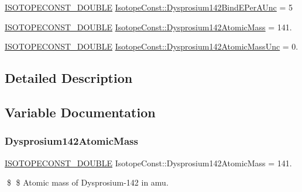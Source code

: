 \begin{DoxyCompactItemize}
\mbox{\hyperlink{group___isotope_const-_macros_ga8f45a7272ce02c0b4c65c44636ed719a}{I\+S\+O\+T\+O\+P\+E\+C\+O\+N\+S\+T\+\_\+\+D\+O\+U\+B\+LE}} \mbox{\hyperlink{group___isotope_const-_dysprosium-_dy142_ga729e250d2463146aabf06a8cfa726ab4}{Isotope\+Const\+::\+Dysprosium142\+Bind\+E\+Per\+A\+Unc}} = 5
\item 
\mbox{\hyperlink{group___isotope_const-_macros_ga8f45a7272ce02c0b4c65c44636ed719a}{I\+S\+O\+T\+O\+P\+E\+C\+O\+N\+S\+T\+\_\+\+D\+O\+U\+B\+LE}} \mbox{\hyperlink{group___isotope_const-_dysprosium-_dy142_ga8f7395bdf273be071bc6ed024f11041d}{Isotope\+Const\+::\+Dysprosium142\+Atomic\+Mass}} = 141.
\item 
\mbox{\hyperlink{group___isotope_const-_macros_ga8f45a7272ce02c0b4c65c44636ed719a}{I\+S\+O\+T\+O\+P\+E\+C\+O\+N\+S\+T\+\_\+\+D\+O\+U\+B\+LE}} \mbox{\hyperlink{group___isotope_const-_dysprosium-_dy142_gaae5a03c060d79bcedf221cc97080e5fd}{Isotope\+Const\+::\+Dysprosium142\+Atomic\+Mass\+Unc}} = 0.
\end{DoxyCompactItemize}


\subsection{Detailed Description}


\subsection{Variable Documentation}
\mbox{\label{group___isotope_const-_dysprosium-_dy142_ga8f7395bdf273be071bc6ed024f11041d}} 
\subsubsection{\texorpdfstring{Dysprosium142\+Atomic\+Mass}{Dysprosium142AtomicMass}}
{\footnotesize\ttfamily \mbox{\hyperlink{group___isotope_const-_macros_ga8f45a7272ce02c0b4c65c44636ed719a}{I\+S\+O\+T\+O\+P\+E\+C\+O\+N\+S\+T\+\_\+\+D\+O\+U\+B\+LE}} Isotope\+Const\+::\+Dysprosium142\+Atomic\+Mass = 141.}

\$ \$ Atomic mass of Dysprosium-\/142 in amu. \mbox{\label{group___isotope_const-_dysprosium-_dy142_gaae5a03c060d79bcedf221cc97080e5fd}} 
